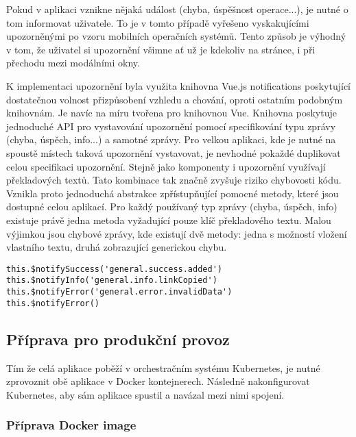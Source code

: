 		Pokud v aplikaci vznikne nějaká událost (chyba, úspěšnost operace...), je nutné o tom informovat uživatele.
		To je v tomto případě vyřešeno vyskakujícími upozorněnými po vzoru mobilních operačních
		systémů.
		Tento způsob je výhodný v tom, že uživatel si upozornění všimne ať už je kdekoliv na stránce, i
		při přechodu mezi modálními okny.


		K implementaci upozornění byla využita knihovna Vue.js notifications
		poskytující dostatečnou volnost přizpůsobení vzhledu a chování, oproti ostatním podobným knihovnám.
		Je navíc na míru tvořena pro knihovnou Vue.
		Knihovna poskytuje jednoduché \ac{API} pro vystavování upozornění pomocí specifikování typu zprávy (chyba, úspěch, info...) a
		samotné zprávy.
		Pro velkou aplikaci, kde je nutné na spoustě místech taková upozornění vystavovat, je nevhodné pokaždé duplikovat
		celou specifikaci upozornění.
		Stejně jako komponenty i upozornění využívají překladových textů.
		Tato kombinace tak značně zvyšuje riziko chybovosti kódu.
		Vznikla proto jednoduchá abstrakce zpřístupňující pomocné metody, které jsou dostupné celou aplikací.
		Pro každý používaný typ zprávy (chyba, úspěch, info) existuje právě jedna metoda vyžadující pouze klíč překladového textu.
		Malou výjimkou jsou chybové zprávy, kde existují dvě metody: jedna s možností vložení vlastního textu, druhá
		zobrazující generickou chybu.

		\begin{lstlisting}[caption={Pomocné metody pro vystavení různých typů upozornění. Zdroj: [autor]}]
this.$notifySuccess('general.success.added')
this.$notifyInfo('general.info.linkCopied')
this.$notifyError('general.error.invalidData')
this.$notifyError()
		\end{lstlisting}

	\subsection{Příprava pro produkční provoz}

	Tím že celá aplikace poběží v orchestračním systému Kubernetes, je nutné zprovoznit obě aplikace v Docker kontejnerech.
	Následně nakonfigurovat Kubernetes, aby sám aplikace spustil a navázal mezi nimi spojení.

		\subsubsection{Příprava Docker image}

